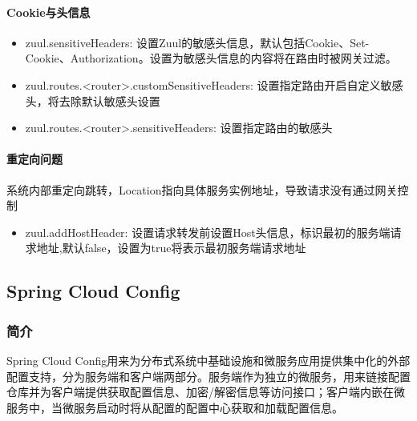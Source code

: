 \documentclass[letterpaper,10pt,english]{sphinxmanual}
\begin{document}
\paragraph{Cookie与头信息}
\label{\detokenize{01.spring-cloud/04.zuul/zuul_01:cookie}}\begin{itemize}
\item {} 
zuul.sensitiveHeaders: 设置Zuul的敏感头信息，默认包括Cookie、Set-Cookie、Authorization。设置为敏感头信息的内容将在路由时被网关过滤。

\item {} 
zuul.routes.\textless{}router\textgreater{}.customSensitiveHeaders: 设置指定路由开启自定义敏感头，将去除默认敏感头设置

\item {} 
zuul.routes.\textless{}router\textgreater{}.sensitiveHeaders: 设置指定路由的敏感头

\end{itemize}


\paragraph{重定向问题}
\label{\detokenize{01.spring-cloud/04.zuul/zuul_01:id12}}
系统内部重定向跳转，Location指向具体服务实例地址，导致请求没有通过网关控制
\begin{itemize}
\item {} 
zuul.addHostHeader: 设置请求转发前设置Host头信息，标识最初的服务端请求地址,默认false，设置为true将表示最初服务端请求地址

\end{itemize}


\subsection{Spring Cloud Config}
\label{\detokenize{01.spring-cloud/05.config/config:spring-cloud-config}}\label{\detokenize{01.spring-cloud/05.config/config::doc}}

\subsubsection{简介}
\label{\detokenize{01.spring-cloud/05.config/config_01:id1}}\label{\detokenize{01.spring-cloud/05.config/config_01::doc}}
Spring Cloud Config用来为分布式系统中基础设施和微服务应用提供集中化的外部配置支持，分为服务端和客户端两部分。服务端作为独立的微服务，用来链接配置仓库并为客户端提供获取配置信息、加密/解密信息等访问接口；客户端内嵌在微服务中，当微服务启动时将从配置的配置中心获取和加载配置信息。
\end{document}
